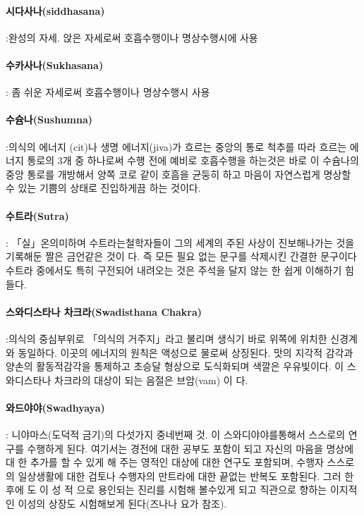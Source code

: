 \documentclass[12pt, a4paper, oneside]{book}
\begin{document}
\paragraph{시다사나(siddhasana)} :완성의 자세. 앉은 자세로써 호흡수행이나 명상수행시에 사용

\paragraph{수카사나(Sukhasana)} : 좀 쉬운 자세로써 호흡수행이나 명상수행시 사용

\paragraph{수슘나(Sushumna)} :의식의 에너지 (cit)나 생명 에너지(jiva)가 흐르는 중앙의 통로 척추를 따라 흐르는 에너지 통로의 3개 중 하나로써 수행 전에 예비로 호흡수행을 하는것은 바로 이 수슘나의 중앙 통로를 개방해서 양쪽 코로 같이 호흠을 균둥히 하고 마음이 자연스럽게 명상할 수 있는 기쁨의 상태로 진입하게끔 하는 것이다.

\paragraph{수트라(Sutra)} : 「실」온의미하며 수트라는철학자들이 그의 세계의 주된 사상이 진보해나가는 것을 기록해둔 짤은 금언같은 것이 다. 즉 모든 필요 없는 문구를 삭제시킨 간결한 문구이다 수트라 중에서도 특히 구전되어 내려오는 것은 주석을 달지 않는 한 쉽게 이해하기 힘들다.

\paragraph{스와디스타나 차크라(Swadisthana Chakra)} :의식의 중심부위로 「의식의 거주지」라고 불리며 생식기 바로 위쪽에 위치한 신경계와 동일하다. 이곳의 에너지의 원칙은 액성으로 물로써 상징된다. 맛의 지각적 감각과 양손의 활동적감각을 통제하고 초승달 형상으로 도식화되며 색깔은 우유빛이다. 이 스와디스타나 차크라의 대상이 되는 음절은 브암(vam) 이 다.


\paragraph{와드야야(Swadhyaya)} : 니야마스(도덕적 금기)의 다섯가지 중네번째 것. 이 스와디야야를통해서 스스로의 연구를 수행하게 된다. 여기서는 경전에 대한 공부도 포함이 되고 자신의 마음을 명상에 대 한 추가를 할 수 있게 해 주는 영적인 대상에 대한 연구도 포함되며, 수행자 스스로의 일상생활에 대한 검토나 수행자의 만트라에 대한 끝없는 반복도 포함된다. 그러 한 후에 도 이 성 적 으로 용인되는 진리를 시험해 볼수있게 되고 직관으로 향하는 이지적인 이성의 상장도 시험해보게 된다(즈나나 요가 참조).
\end{document}
